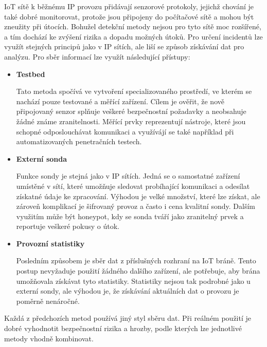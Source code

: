  IoT sítě k běžnému IP provozu přidávají senzorové protokoly, jejichž chování je také dobré monitorovat, 
 protože jsou připojeny do počítačové sítě a mohou být zneužity při útocích. Bohužel detekční metody 
 nejsou pro tyto sítě moc rozšířené, a tím dochází ke zvýšení rizika a dopadu možných útoků. Pro určení 
 incidentů lze využít stejných principů jako v IP sítích, ale liší se způsob získávání dat pro analýzu. 
 Pro sběr informací lze využít následující přístupy:
 \begin{itemize}
  \item \textbf{Testbed}
  
    Tato metoda spočívá ve vytvoření specializovaného prostředí, ve kterém se nachází pouze testované 
    a měřící zařízení. Cílem je ověřit, že nově připojovaný senzor splňuje veškeré bezpečnostní 
    požadavky a neobsahuje žádné známe zranitelnosti. Měřící prvky reprezentují nástroje, které 
    jsou schopné odposlouchávat komunikaci a využívájí se také například při automatizovaných
    penetračních testech.   
  \item \textbf{Externí sonda}
  
  Funkce sondy je stejná jako v IP sítích. Jedná se o samostatné zařízení umístěné v sítí, které
  umožňuje sledovat probíhající komunikaci a odesílat získatné údaje ke zpracování. 
  Výhodou je velké množství, které lze získat, ale zároveň komplikací je šifrovaný provoz
  a často i cena kvalitní sondy.
  Dalším využitím 
  může být honeypot, kdy se sonda tváří jako zranitelný prvek a reportuje veškeré pokusy o útok.
    
  \item \textbf{Provozní statistiky}
  
  Posledním způsobem je sběr dat z příslušných rozhraní na IoT bráně. Tento postup nevyžaduje použití
  žádného dalšího zařízení, ale potřebuje, aby brána umožňovala získávat tyto statistiky. 
  Statistiky nejsou tak podrobné jako u externí sondy, ale výhodou je, 
  že získávání aktuálních dat o provozu je poměrně nenáročné.
 \end{itemize}
 
 Každá z předchozích metod používá jiný styl sběru dat. Při reálném použití je dobré vyhodnotit 
 bezpečnostní rizika a hrozby, podle kterých lze jednotlivé metody vhodně kombinovat.

 \newpage
